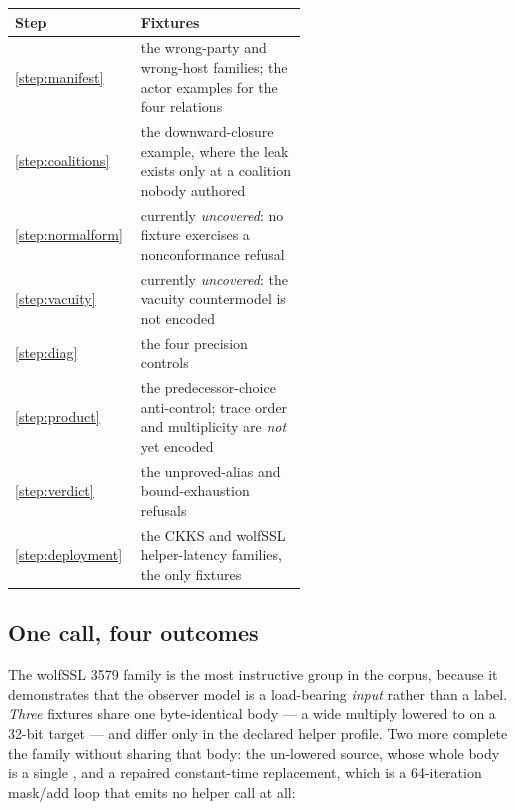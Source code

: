\begin{center}
\begin{tabular}{@{}l p{0.58\linewidth}@{}}
\toprule
Step & Fixtures \\
\midrule
\cref{step:manifest}    & the wrong-party and wrong-host families; the actor
                          examples for the four relations \\
\cref{step:coalitions}  & the downward-closure example, where the leak exists
                          only at a coalition nobody authored \\
\cref{step:normalform}  & currently \emph{uncovered}: no fixture exercises a
                          nonconformance refusal \\
\cref{step:vacuity}     & currently \emph{uncovered}: the vacuity countermodel
                          is not encoded \\
\cref{step:diag}        & the four precision controls \\
\cref{step:product}     & the predecessor-choice anti-control; trace order and
                          multiplicity are \emph{not} yet encoded \\
\cref{step:verdict}     & the unproved-alias and bound-exhaustion refusals \\
\cref{step:deployment}  & the CKKS and wolfSSL helper-latency families, the only
                          \Conditional{} fixtures \\
\bottomrule
\end{tabular}
\end{center}

\subsection{One call, four outcomes}

The wolfSSL 3579 family is the most instructive group in the corpus, because it
demonstrates that the observer model is a load-bearing \emph{input} rather than a
label. \emph{Three} fixtures share one byte-identical body --- a wide multiply
lowered to  on a 32-bit target --- and differ only in the
declared helper profile. Two more complete the family without sharing that body:
the un-lowered source, whose whole body is a single , and a
repaired constant-time replacement, which is a 64-iteration mask/add loop that
emits no helper call at all:

